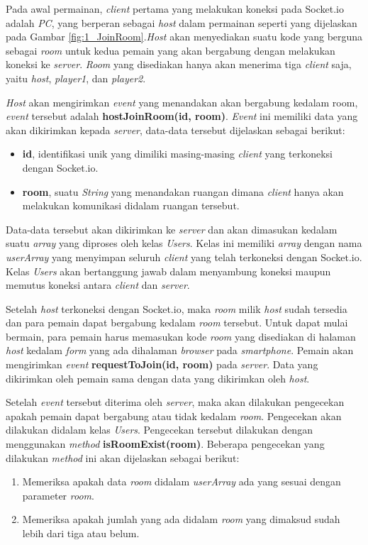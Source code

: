 Pada awal permainan, \textit{client} pertama yang melakukan koneksi pada Socket.io adalah \textit{PC}, yang berperan sebagai \textit{host} dalam permainan seperti yang dijelaskan pada Gambar \ref{fig:1_JoinRoom}.\textit{Host} akan menyediakan suatu kode yang berguna sebagai \textit{room} untuk kedua pemain yang akan bergabung dengan melakukan koneksi ke \textit{server}. \textit{Room} yang disediakan hanya akan menerima tiga \textit{client} saja, yaitu \textit{host}, \textit{player1}, dan \textit{player2}. 

\textit{Host} akan mengirimkan \textit{event} yang menandakan akan bergabung kedalam room, \textit{event} tersebut adalah \textbf{hostJoinRoom(id, room)}. \textit{Event} ini memiliki data yang akan dikirimkan kepada \textit{server}, data-data tersebut dijelaskan sebagai berikut:
\begin{itemize}
	\item \textbf{id}, identifikasi unik yang dimiliki masing-masing \textit{client} yang terkoneksi dengan Socket.io.
	\item \textbf{room}, suatu \textit{String} yang menandakan ruangan dimana \textit{client} hanya akan melakukan komunikasi didalam ruangan tersebut.
\end{itemize}

Data-data tersebut akan dikirimkan ke \textit{server} dan akan dimasukan kedalam suatu \textit{array} yang diproses oleh kelas \textit{Users}. Kelas ini memiliki \textit{array} dengan nama \textit{userArray} yang menyimpan seluruh \textit{client} yang telah terkoneksi dengan Socket.io. Kelas \textit{Users} akan bertanggung jawab dalam menyambung koneksi maupun memutus koneksi antara \textit{client} dan \textit{server}.

Setelah \textit{host} terkoneksi dengan Socket.io, maka \textit{room} milik \textit{host} sudah tersedia dan para pemain dapat bergabung kedalam \textit{room} tersebut. Untuk dapat mulai bermain, para pemain harus memasukan kode \textit{room} yang disediakan di halaman \textit{host} kedalam \textit{form} yang ada dihalaman \textit{browser} pada \textit{smartphone}. Pemain akan mengirimkan \textit{event} \textbf{requestToJoin(id, room)} pada \textit{server}. Data yang dikirimkan oleh pemain sama dengan data yang dikirimkan oleh \textit{host}. 

Setelah \textit{event} tersebut diterima oleh \textit{server}, maka akan dilakukan pengecekan apakah pemain dapat bergabung atau tidak kedalam \textit{room}. Pengecekan akan dilakukan didalam kelas \textit{Users}. Pengecekan tersebut dilakukan dengan menggunakan \textit{method} \textbf{isRoomExist(room)}. Beberapa pengecekan yang dilakukan \textit{method} ini akan dijelaskan sebagai berikut:
\begin{enumerate}
	\item Memeriksa apakah data \textit{room} didalam \textit{userArray} ada yang sesuai dengan parameter \textit{room}.
	\item Memeriksa apakah jumlah yang ada didalam \textit{room} yang dimaksud sudah lebih dari tiga atau belum.
\end{enumerate}

